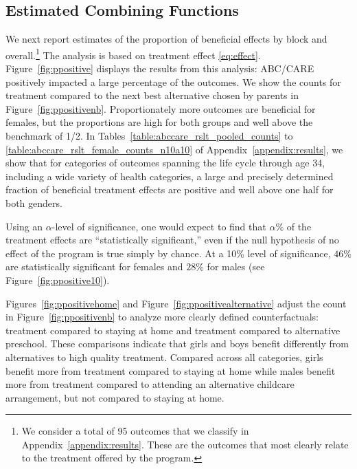 \subsection{Estimated Combining Functions}

We next report estimates of the proportion of beneficial effects by block and overall.\footnote{We consider a total of 95 outcomes that we classify in Appendix~\ref{appendix:results}. These are the outcomes that most clearly relate to the treatment offered by the program.} The analysis is based on treatment effect \eqref{eq:effect}. Figure~\ref{fig:ppositive} displays the results from this analysis: ABC/CARE positively impacted a large percentage of the outcomes. We show the counts for treatment compared to the next best alternative chosen by parents in Figure~\ref{fig:ppositivenb}. Proportionately more outcomes are beneficial for females, but the proportions are high for both groups and well above the benchmark of 1/2. In Tables~\ref{table:abccare_rslt_pooled_counts} to \ref{table:abccare_rslt_female_counts_n10a10} of Appendix~\ref{appendix:results}, we show that for categories of outcomes spanning the life cycle through age 34, including a wide variety of health categories, a large and precisely determined fraction of beneficial treatment effects are positive and well above one half for both genders.

Using an $\alpha$-level of significance, one would expect to find that $\alpha\%$ of the treatment effects are ``statistically significant,'' even if the null hypothesis of no effect of the program is true simply by chance. At a 10\% level of significance, $46\%$ are statistically significant for females and $28\%$ for males (see Figure~\ref{fig:ppositive10}).

Figures~\ref{fig:ppositivehome} and Figure~\ref{fig:ppositivealternative} adjust the count in Figure~\ref{fig:ppositivenb} to analyze more clearly defined counterfactuals: treatment compared to staying at home and treatment compared to alternative preschool. These comparisons indicate that girls and boys benefit differently from alternatives to high quality treatment. Compared across all categories, girls benefit more from treatment compared to staying at home while males benefit more from treatment compared to attending an alternative childcare arrangement, but not compared to staying at home.

